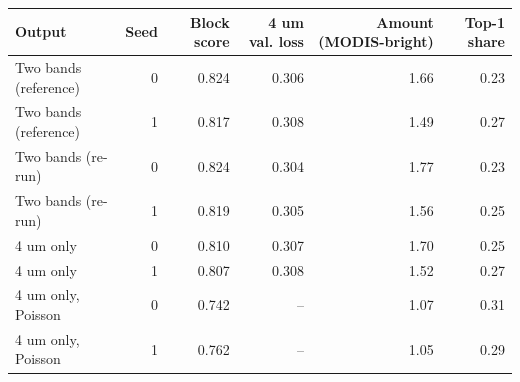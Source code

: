 \begin{tabular}{lrrrrr}
\toprule
Output & Seed & Block score & 4 um val. loss & Amount (MODIS-bright) & Top-1 share \\
\midrule
Two bands (reference) & 0 & 0.824 & 0.306 & 1.66 & 0.23 \\
Two bands (reference) & 1 & 0.817 & 0.308 & 1.49 & 0.27 \\
Two bands (re-run) & 0 & 0.824 & 0.304 & 1.77 & 0.23 \\
Two bands (re-run) & 1 & 0.819 & 0.305 & 1.56 & 0.25 \\
\midrule
4 um only & 0 & 0.810 & 0.307 & 1.70 & 0.25 \\
4 um only & 1 & 0.807 & 0.308 & 1.52 & 0.27 \\
4 um only, Poisson & 0 & 0.742 & -- & 1.07 & 0.31 \\
4 um only, Poisson & 1 & 0.762 & -- & 1.05 & 0.29 \\
\bottomrule
\end{tabular}
